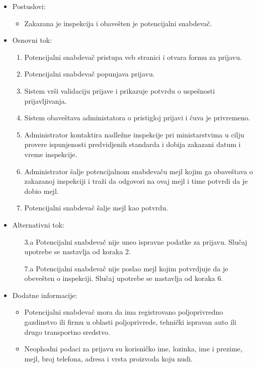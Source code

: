 \begin{itemize}
	\item Postuslovi:
		\begin{itemize}
					\item Zakazana je inspekcija i obavešten je potencijalni snabdevač.
		\end{itemize}		
	\item Osnovni tok:
		\begin{enumerate}
		    \item Potencijalni snabdevač pristupa veb stranici i otvara formu za prijavu.
		    \item Potencijalni snabdevač popunjava prijavu.
		    \item Sistem vrši validaciju prijave i prikazuje potvrdu o uspešnosti prijavljivanja.
		    \item Sistem obaveštava administatora o pristigloj prijavi i čuva je privremeno.
		    \item Administrator kontaktira nadležne inspekcije pri ministarstvima u cilju provere ispunjenosti predvidjenih standarda i dobija zakazani datum i vreme inspekcije.
		    \item Administrator šalje potencijalnom snabdevaču mejl kojim ga obaveštava o zakazanoj inspekciji i traži da odgovori na ovaj mejl i time potvrdi da je dobio mejl.
		    \item Potencijalni snabdevač šalje mejl kao potvrdu.
		\end{enumerate}
	\item Alternativni tok:
		\begin{itemize}
    		\item[3.a] Potencijalni snabdevač nije uneo ispravne podatke za prijavu. Slučaj upotrebe se nastavlja od koraka 2.
		    \item[7.a] Potencijalni snabdevač nije poslao mejl kojim potvrdjuje da je obevešten o inspekciji. Slučaj upotrebe se nastavlja od koraka 6.
		\end{itemize} 
	\item Dodatne informacije:
		\begin{itemize}
		    \item Potencijalni snabdevač mora da ima registrovano poljoprivredno gazdinstvo ili firmu u oblasti poljoprivrede, tehnički ispravan auto ili drugo transportno sredstvo.
			\item Neophodni podaci za prijavu su korisničko ime, lozinka, ime i prezime, mejl, broj telefona, adresa i vrsta proizvoda koju nudi.
		\end{itemize}
						
\end{itemize}

